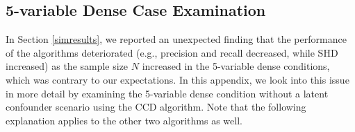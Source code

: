 \documentclass[twoside, 11pt]{article}
\newcommand*{\figref}[2][]{%
  \hyperref[{fig:#2}]{%
    Figure~\ref*{fig:#2}%
    \ifx\\#1\\%
    \else
      #1%
    \fi
  }%
}
\begin{document}
\begin{appendices}


\section{5-variable Dense Case Examination}\label{5pdenseexam}

In Section \ref{simresults}, we reported an unexpected finding that the performance of the algorithms deteriorated (e.g., precision and recall decreased, while SHD increased) as the sample size $N$ increased in the 5-variable dense conditions, which was contrary to our expectations. 
In this appendix, we look into this issue in more detail by examining the 5-variable dense condition without a latent confounder scenario using the CCD algorithm. Note that the following explanation applies to the other two algorithms as well.



\end{appendices}
\end{document}
